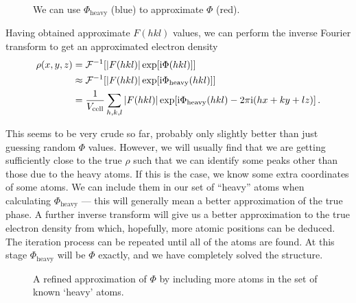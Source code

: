 \documentclass{article}
\theoremstyle{plain}\theoremheaderfont{\normalfont\itshape}\theorembodyfont{\rmfamily}\theoremseparator{.}\newtheorem*{rem}{Remark}\newtheorem*{ex}{Example}\newtheorem*{proof}{Proof}\newtheorem*{altp}{Alternative proof}
\theoremstyle{plain}\theoremheaderfont{\normalfont\bfseries}\theorembodyfont{\rmfamily}\theoremseparator{.}\newtheorem{thm}{Theorem}[section]\newtheorem{lem}[thm]{Lemma}\newtheorem{prop}[thm]{Proposition}\newtheorem*{cor}{Corollary}\newtheorem{defn}[thm]{Definition}\newtheorem{clm}[thm]{Claim}\newtheorem{clminproof}{Claim}\newtheorem*{law}{Law}\newtheorem{pos}[thm]{Postulate}
\theoremstyle{break}\theoremheaderfont{\normalfont\itshape}\theorembodyfont{\rmfamily}\theoremseparator{.\medskip}\newtheorem*{proofskip}{Proof}\newtheorem*{exs}{Examples}\newtheorem*{rems}{Remarks}
\theoremstyle{break}\theoremheaderfont{\normalfont\bfseries}\theorembodyfont{\rmfamily}\theoremseparator{.\medskip}\newtheorem{lemskip}[thm]{Lemma}\newtheorem{defnskip}[thm]{Definition}\newtheorem{propskip}[thm]{Proposition}\newtheorem{thmskip}[thm]{Theorem}
\numberwithin{equation}{section}
\newcommand{\ii}{\mathrm{i}}
\newcommand{\abs}[1]{\left| #1 \right|}
\begin{document}
    \begin{figure}
        \centering
        \caption{We can use \(\Phi_{\text{heavy}}\) (blue) to approximate \(\Phi\) (red).}
    \end{figure}

    Having obtained approximate \(F(hkl)\) values, we can perform the inverse Fourier transform to get an approximated electron density
    \begin{align}
        \rho(x,y,z)&=\mathcal{F}^{-1}[\abs{F(hkl)}\exp[\ii\Phi(hkl)]]\notag\\
        &\approx\mathcal{F}^{-1}[\abs{F(hkl)}\exp[\ii\Phi_{\text{heavy}}(hkl)]]\notag\\
        &=\frac{1}{V_{\text{cell}}}\sum_{h,k,l}\abs{F(hkl)}\exp[\ii\Phi_{\text{heavy}}(hkl)-2\pi\ii(hx+ky+lz)]\,.
    \end{align}

    This seems to be very crude so far, probably only slightly better than just guessing random \(\Phi\) values. However, we will usually find that we are getting sufficiently close to the true \(\rho\) such that we can identify some peaks other than those due to the heavy atoms. If this is the case, we know some extra coordinates of some atoms. We can include them in our set of ``heavy'' atoms when calculating \(\Phi_{\text{heavy}}\) --- this will generally mean a better approximation of the true phase. A further inverse transform will give us a better approximation to the true electron density from which, hopefully, more atomic positions can be deduced. The iteration process can be repeated until all of the atoms are found. At this stage \(\Phi_{\text{heavy}}\) will be \(\Phi\) exactly, and we have completely solved the structure.

    \begin{figure}[ht!]
        \centering
        \caption{A refined approximation of \(\Phi\) by including more atoms in the set of known `heavy' atoms.}
    \end{figure}
\end{document}
